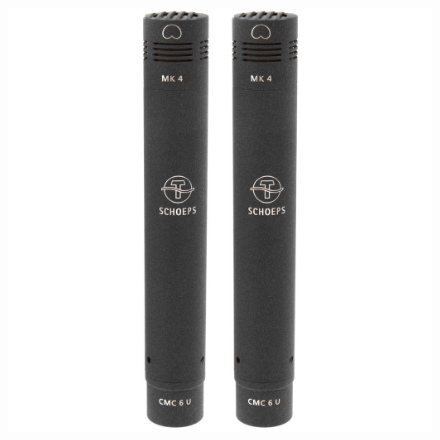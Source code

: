 \documentclass[
  letterpaper,
  DIV=11,
  numbers=noendperiod]{scrreprt}
\begin{document}
\begin{figure}
\begin{minipage}[t]{0.33\linewidth}
{{\includegraphics{outils_equipements/../_resources/bitmap/mic/cmc64.jpg}

}

}

\end{minipage}%
%
\begin{minipage}[t]{0.33\linewidth}

{\centering 

}
\end{minipage}
\end{figure}
\end{document}
